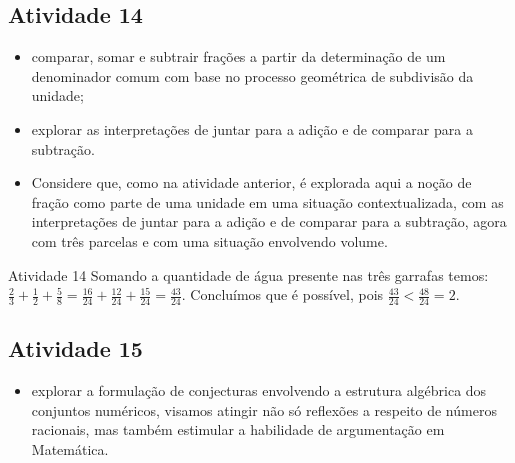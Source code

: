 \subsection{Atividade 14}

  \newline \vspace{.15cm}

  \begin{itemize} %
    \item       comparar, somar e subtrair frações a partir da determinação de um denominador comum com base no processo geométrica de subdivisão da unidade;
    \item       explorar as interpretações de juntar para a adição e de comparar para a subtração.
\end{itemize} %

   \vspace{.15cm}

  \begin{itemize} %
    \item       Considere que, como na atividade anterior, é explorada aqui a noção de fração como parte de uma unidade em uma situação contextualizada, com as interpretações de juntar para a adição e de comparar para a subtração, agora com três parcelas e com uma situação envolvendo volume.
\end{itemize} %


\begin{resposta*}{Atividade 14}
  Somando a quantidade de água presente nas três garrafas temos:   $\frac{2}{3}+\frac{1}{2}+\frac{5}{8} = \frac{16}{24}+\frac{12}{24}+\frac{15}{24} = \frac{43}{24}$. Concluímos que é possível, pois   $\frac{43}{24}<\frac{48}{24}=2$.
\end{resposta*}



\subsection{Atividade 15}

   \vspace{.15cm}

  \begin{itemize} %
    \item       explorar a formulação de conjecturas envolvendo a estrutura algébrica dos conjuntos numéricos, visamos atingir não só reflexões a respeito de números racionais, mas também estimular a habilidade de argumentação em Matemática.
\end{itemize} %


